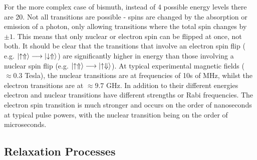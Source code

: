 For the more complex case of bismuth, instead of 4 possible energy levels there are 20. 
Not all transitions are possible - spins are changed by the absorption or emission of a photon, only allowing transitions where the total spin changes by $\pm1$.
This means that only nuclear or electron spin can be flipped at once, not both. 
It should be clear that the transitions that involve an electron spin flip ( e.g. $\ket{\uparrow \Uparrow} \longrightarrow \ket{\downarrow \Uparrow}$) are significantly higher in energy than those involving a nuclear spin flip (e.g. $\ket{\uparrow \Uparrow} \longrightarrow \ket{\uparrow \Downarrow}$). 
At typical experimental magnetic fields ($\approx 0.3$ Tesla), the nuclear transitions are at frequencies of 10s of MHz, whilst the electron transitions are at $\approx 9.7$ GHz.
In addition to their different energies electron and nuclear transitions have different strengths or Rabi frequencies. 
The electron spin transition is much stronger and occurs on the order of nanoseconds at typical pulse powers, with the nuclear transition being on the order of microseconds.

\subsection{Relaxation Processes}
\label{sec:relProc}

